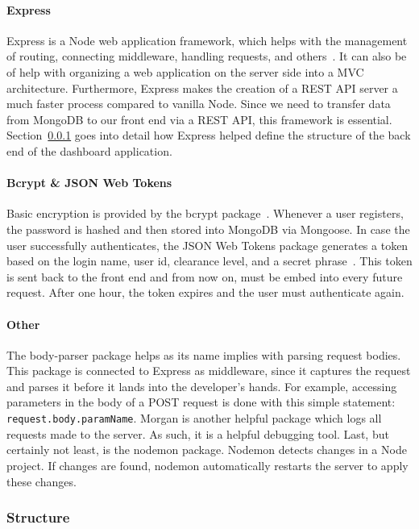             \paragraph{Express} Express is a Node web application framework, which helps with the management of routing, connecting middleware, handling requests, and others~\cite{Express}. It can also be of help with organizing a web application on the server side into a MVC architecture. Furthermore, Express makes the creation of a REST API server a much faster process compared to vanilla Node. Since we need to transfer data from MongoDB to our front end via a REST API, this framework is essential. Section~\ref{backend_structure} goes into detail how Express helped define the structure of the back end of the dashboard application.

            \paragraph{Bcrypt \& JSON Web Tokens} Basic encryption is provided by the bcrypt package~\cite{Bcrypt}. Whenever a user registers, the password is hashed and then stored into MongoDB via Mongoose. In case the user successfully authenticates, the JSON Web Tokens package generates a token based on the login name, user id, clearance level, and a secret phrase~\cite{JWT}. This token is sent back to the front end and from now on, must be embed into every future request. After one hour, the token expires and the user must authenticate again.

            \paragraph{Other} The body-parser package helps as its name implies with parsing request bodies. This package is connected to Express as middleware, since it captures the request and parses it before it lands into the developer's hands. For example, accessing parameters in the body of a POST request is done with this simple statement: \texttt{request.body.paramName}. Morgan is another helpful package which logs all requests made to the server. As such, it is a helpful debugging tool. Last, but certainly not least, is the nodemon package. Nodemon detects changes in a Node project. If changes are found, nodemon automatically restarts the server to apply these changes.


        \subsubsection{Structure}\label{backend_structure}
        

